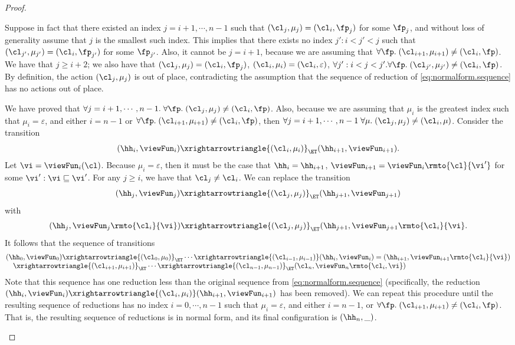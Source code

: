 \begin{proof}
\begin{enumerate}
Suppose in fact that there existed 
an index $j = i+1,\cdots, n-1$ such that $(\cl_{j}, \mu_{j}) = (\cl_{i}, \fp_{j})$ for some 
$\fp_{j}$, and without loss of generality assume that $j$ is the smallest such index. This implies that 
there exists no index $j': i < j' < j$ such that $(\cl_{j'}, \mu_{j'}) = (\cl_{i}, \fp_{j'})$ for some 
$\fp_{j'}$. Also, it cannot be $j = i+1$, because we are assuming that $\forall \fp.\;(\cl_{i+1}, \mu_{i+1}) \neq 
(\cl_{i}, \fp)$.  We have that $j \geq i+2$; we also have that  $(\cl_{j}, \mu_{j}) = (\cl_{i}, \fp_{j})$, 
$(\cl_{i}, \mu_{i}) = (\cl_{i}, \varepsilon)$, $\forall j': i < j < j'.\forall \fp.\; (\cl_{j'}, \mu_{j'}) \neq (\cl_{i}, \fp)$. 
By definition, the action $(\cl_{j}, \mu_{j})$ is out of place, contradicting the assumption that the sequence of 
reduction of \cref{eq:normalform.sequence} has no actions out of place.

We have proved that $\forall j = i+1, \cdots, n-1.\;\forall \fp.\;(\cl_{j}, \mu_{j}) \neq (\cl_{i}, \fp)$. 
Also, because we are assuming that $\mu_{i}$ is the greatest index such that $\mu_{i} = \varepsilon$, 
and either $i= n-1$ or $\forall \fp.\;(\cl_{i+1},\mu_{i+1}) \neq (\cl_{i}, \fp)$, 
then $\forall j=i+1,\cdots, n-1\;\forall \mu.\;(\cl_{j}, \mu_{j}) \neq (\cl_{i}, \mu)$. 
Consider the transition 
\[
(\hh_{i}, \viewFun_{i}) \xrightarrowtriangle{(\cl_{i}, \mu_{i})}_{\ET} (\hh_{i+1}, \viewFun_{i+1}).
\]
Let $\vi = \viewFun_{i}(\cl)$. Because $\mu_{i} = \varepsilon$, then it must be the case that 
$\hh_{i} = \hh_{i+1}$, $\viewFun_{i+1} = \viewFun_{i}\rmto{\cl}{\vi'}$ for some $\vi' : \vi \sqsubseteq \vi'$. 
For any $j \geq i$, we have that $\cl_{j} \neq \cl_{i}$. We can replace the transition 
\[
(\hh_{j}, \viewFun_{j}) \xrightarrowtriangle{(\cl_{j}, \mu_{j})}_{\ET} (\hh_{j+1}, \viewFun_{j+1})
\]
with 
\[
(\hh_{j}, \viewFun_{j}\rmto{\cl_{i}}{\vi}) \xrightarrowtriangle{(\cl_{j}, \mu_{j})}_{\ET} (\hh_{j+1}, \viewFun_{j+1}\rmto{\cl_{i}}{\vi}.
\]
It follows that the sequence of transitions 
\[ 
\begin{array}{@{}l@{}}
(\hh_{0}, \viewFun_{0}) \xrightarrowtriangle{(\cl_{0}, \mu_{0})}_{\ET} \cdots \xrightarrowtriangle{(\cl_{i-1},\mu_{i-1})} 
(\hh_{i}, \viewFun_{i}) = (\hh_{i+1}, \viewFun_{i+1}\rmto{\cl_{i}}{\vi})  \\
\quad \xrightarrowtriangle{(\cl_{i+1}, \mu_{i+1})}_{\ET} \cdots 
\xrightarrowtriangle{(\cl_{n-1}, \mu_{n-1})}_{\ET} (\cl_{n}, \viewFun_{n}\rmto{\cl_{i}, \vi})
\end{array}
\]
Note that this sequence has one reduction less than the original sequence from \eqref{eq:normalform.sequence} (specifically, 
the reduction $(\hh_{i}, \viewFun_{i}) \xrightarrowtriangle{(\cl_{i}, \mu_{i})} (\hh_{i+1}, \viewFun_{i+1})$ has 
been removed). We can repeat this procedure until the resulting sequence of reductions has no index $i=0,\cdots, n-1$ such that  
$\mu_{i} = \varepsilon$, and either $i = n-1$, or 
$\forall \fp.\; (\cl_{i+1}, \mu_{i+1}) \neq (\cl_{i}, \fp)$. That is, the resulting sequence of reductions is in normal form, 
and its final configuration is $(\hh_{n}, \_)$.


\end{enumerate}
\end{proof}
